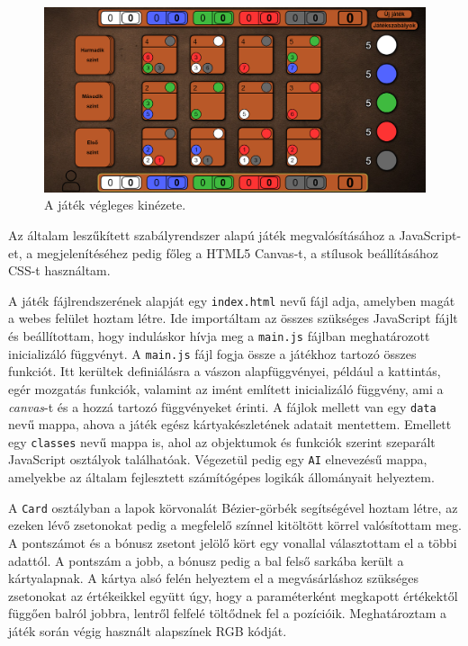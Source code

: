 \begin{figure}[h]
\centering
\includegraphics[width=\textwidth]{images/screen_structure.png}
\caption{A játék végleges kinézete.}
\label{fig:screen_structure}
\end{figure}


Az általam leszűkített szabályrendszer alapú játék megvalósításához a JavaScript-et, a megjelenítéséhez pedig főleg a HTML5 Canvas-t, a stílusok beállításához CSS-t használtam.


A játék fájlrendszerének alapját egy \texttt{index.html} nevű fájl adja, amelyben magát a webes felület hoztam létre. Ide importáltam az összes szükséges JavaScript fájlt és beállítottam, hogy induláskor hívja meg a \texttt{main.js} fájlban meghatározott inicializáló függvényt. A \texttt{main.js} fájl fogja össze a játékhoz tartozó összes funkciót. Itt kerültek definiálásra a vászon alapfüggvényei, például a kattintás, egér mozgatás funkciók, valamint az imént említett inicializáló függvény, ami a \textit{canvas}-t és a hozzá tartozó függvényeket érinti. A fájlok mellett van egy \texttt{data} nevű mappa, ahova a játék egész kártyakészletének adatait mentettem. Emellett egy \texttt{classes} nevű mappa is, ahol az objektumok és funkciók szerint szeparált JavaScript osztályok találhatóak. Végezetül pedig egy \texttt{AI} elnevezésű mappa, amelyekbe az általam fejlesztett számítógépes logikák állományait helyeztem.


A \texttt{Card} osztályban a lapok körvonalát Bézier-görbék segítségével hoztam létre, az ezeken lévő zsetonokat pedig a megfelelő színnel kitöltött körrel valósítottam meg. A pontszámot és a bónusz zsetont jelölő kört egy vonallal választottam el a többi adattól. A pontszám a jobb, a bónusz pedig a bal felső sarkába került a kártyalapnak. A kártya alsó felén helyeztem el a megvásárláshoz szükséges zsetonokat az értékeikkel együtt úgy, hogy a paraméterként megkapott értékektől függően balról jobbra, lentről felfelé töltődnek fel a pozícióik. Meghatároztam a játék során végig használt alapszínek RGB kódját.

